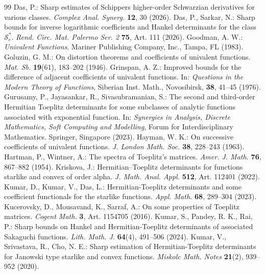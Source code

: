 \documentclass[10pt,a4paper]{amsart}
\numberwithin{equation}{section}
\begin{document}
\begin{thebibliography}{99}
 Das, P.: Sharp estimates of Schippers higher-order Schwarzian derivatives for various classes. \textit{Complex Anal. Synerg.} \textbf{12}, 30 (2026). %
 Das, P., Sarkar, N.: Sharp bounds for inverse logarithmic coefficients and Hankel determinants for the class $\mathcal{S}_{e}^{*}$. \textit{Rend. Circ. Mat. Palermo Ser. 2} \textbf{75}, Art. 111 (2026).
 Goodman, A. W.: \textit{Univalent Functions}. Mariner Publishing Company, Inc., Tampa, FL (1983).
 Goluzin, G. M.: On distortion theorems and coefficients of univalent functions. \textit{Mat. Sb.} \textbf{19}(61), 183--202 (1946).
 Grinspan, A. Z.: Improved bounds for the difference of adjacent coefficients of univalent functions. In: \textit{Questions in the Modern Theory of Functions}, Siberian Inst. Math., Novosibirsk, \textbf{38}, 41--45 (1976).
 Gurusamy, P., Jayasankar, R., Sivasubramanian, S.: The second and third-order Hermitian Toeplitz determinants for some subclasses of analytic functions associated with exponential function. In: \textit{Synergies in Analysis, Discrete Mathematics, Soft Computing and Modelling}, Forum for Interdisciplinary Mathematics. Springer, Singapore (2023).
 Hayman, W. K.: On successive coefficients of univalent functions. \textit{J. London Math. Soc.} \textbf{38}, 228--243 (1963).
 Hartman, P., Wintner, A.: The spectra of Toeplitz's matrices. \textit{Amer. J. Math.} \textbf{76}, 867--882 (1954).
 Kriskova, J.: Hermitian--Toeplitz determinants for functions starlike and convex of order alpha. \textit{J. Math. Anal. Appl.} \textbf{512}, Art. 112401 (2022).
 Kumar, D., Kumar, V., Das, L.: Hermitian-Toeplitz determinants and some coefficient functionals for the starlike functions. \textit{Appl. Math.} \textbf{68}, 289--304 (2023).
 Kucerovsky, D., Mousavand, K., Sarraf, A.: On some properties of Toeplitz matrices. \textit{Cogent Math.} \textbf{3}, Art. 1154705 (2016).
 Kumar, S., Pandey, R. K., Rai, P.: Sharp bounds on Hankel and Hermitian-Toeplitz determinants of associated Sakaguchi functions. \textit{Lith. Math. J.} \textbf{64}(4), 491--506 (2024).
 Kumar, V., Srivastava, R., Cho, N. E.: Sharp estimation of Hermitian-Toeplitz determinants for Janowski type starlike and convex functions. \textit{Miskolc Math. Notes} \textbf{21}(2), 939--952 (2020).

\end{thebibliography}
\end{document}
